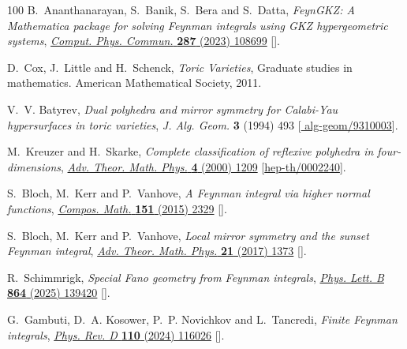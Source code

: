 \documentclass[12pt,a4paper]{article}
\theoremstyle{plain}
\theoremstyle{remark}
\begin{document}
\begin{thebibliography}{100}
B.~Ananthanarayan, S.~Banik, S.~Bera and S.~Datta, \emph{{FeynGKZ: A
  Mathematica package for solving Feynman integrals using GKZ hypergeometric
  systems}}, \href{https://doi.org/10.1016/j.cpc.2023.108699}{\emph{Comput.
  Phys. Commun.} {\bfseries 287} (2023) 108699}
  [\href{https://arxiv.org/abs/2211.01285}{{}}].

D.~Cox, J.~Little and H.~Schenck, \emph{Toric Varieties}, Graduate studies in
  mathematics. American Mathematical Society, 2011.

V.~V. Batyrev, \emph{{Dual polyhedra and mirror symmetry for Calabi-Yau
  hypersurfaces in toric varieties}}, {\emph{J. Alg. Geom.} {\bfseries 3}
  (1994) 493} [\href{https://arxiv.org/abs/alg-geom/9310003}{{\ttfamily
  alg-geom/9310003}}].

M.~Kreuzer and H.~Skarke, \emph{{Complete classification of reflexive polyhedra
  in four-dimensions}},
  \href{https://doi.org/10.4310/ATMP.2000.v4.n6.a2}{\emph{Adv. Theor. Math.
  Phys.} {\bfseries 4} (2000) 1209}
  [\href{https://arxiv.org/abs/hep-th/0002240}{{\ttfamily hep-th/0002240}}].

S.~Bloch, M.~Kerr and P.~Vanhove, \emph{{A Feynman integral via higher normal
  functions}}, \href{https://doi.org/10.1112/S0010437X15007472}{\emph{Compos.
  Math.} {\bfseries 151} (2015) 2329}
  [\href{https://arxiv.org/abs/1406.2664}{{}}].

S.~Bloch, M.~Kerr and P.~Vanhove, \emph{{Local mirror symmetry and the sunset
  Feynman integral}},
  \href{https://doi.org/10.4310/ATMP.2017.v21.n6.a1}{\emph{Adv. Theor. Math.
  Phys.} {\bfseries 21} (2017) 1373}
  [\href{https://arxiv.org/abs/1601.08181}{{}}].

R.~Schimmrigk, \emph{{Special Fano geometry from Feynman integrals}},
  \href{https://doi.org/10.1016/j.physletb.2025.139420}{\emph{Phys. Lett. B}
  {\bfseries 864} (2025) 139420}
  [\href{https://arxiv.org/abs/2412.20236}{{}}].

G.~Gambuti, D.~A. Kosower, P.~P. Novichkov and L.~Tancredi, \emph{{Finite
  Feynman integrals}},
  \href{https://doi.org/10.1103/PhysRevD.110.116026}{\emph{Phys. Rev. D}
  {\bfseries 110} (2024) 116026}
  [\href{https://arxiv.org/abs/2311.16907}{{}}].


\end{thebibliography}
\end{document}
